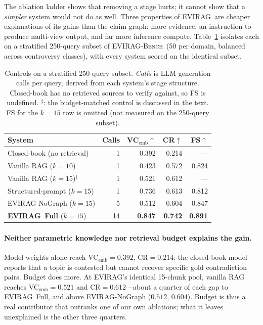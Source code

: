 \documentclass[11pt]{article}
\newcommand{\system}{\textsc{EVIRAG}\xspace}
\newcommand{\bench}{\textsc{EVIRAG-Bench}\xspace}
\begin{document}
The ablation ladder shows that removing a stage hurts; it cannot show that a
\emph{simpler} system would not do as well.  Three properties of \system\ are
cheaper explanations of its gains than the claim graph: more evidence, an
instruction to produce multi-view output, and far more inference compute.
Table~\ref{tab:controls} isolates each on a stratified 250-query subset of
\bench\ (50 per domain, balanced across controversy classes), with every system
scored on the identical subset.

\begin{table}[t]
\centering\small
\setlength{\tabcolsep}{3.5pt}
\begin{tabular}{@{}lrrrr@{}}
\toprule
\textbf{System} & \textbf{Calls} & VC$_{\text{emb}}$$\uparrow$ & CR$\uparrow$ & FS$\uparrow$ \\
\midrule
Closed-book (no retrieval)   & 1 & 0.392 & 0.214 & --- \\
Vanilla RAG ($k{=}10$)       & 1 & 0.423 & 0.572 & 0.824 \\
Vanilla RAG ($k{=}15$)$^\ddagger$ & 1 & 0.521 & 0.612 & --- \\
Structured-prompt ($k{=}15$) & 1 & 0.736 & 0.613 & 0.812 \\
\midrule
\system-NoGraph ($k{=}15$)   & \phantom{0}5 & 0.512 & 0.604 & 0.847 \\
\textbf{\system\ Full} ($k{=}15$) & 14 & \textbf{0.847} & \textbf{0.742} & \textbf{0.891} \\
\bottomrule
\end{tabular}
\caption{Controls on a stratified 250-query subset.  \emph{Calls} is
LLM generation calls per query, derived from each system's stage structure.
Closed-book has no retrieved sources to verify against, so FS is undefined.
$^\ddagger$: the budget-matched control is discussed in the text.
FS for the $k{=}15$ row is omitted (not measured on the 250-query subset).
}
\label{tab:controls}
\end{table}

\paragraph{Neither parametric knowledge nor retrieval budget explains the gain.}
Model weights alone reach VC$_\text{emb}{=}0.392$, CR$=0.214$: the closed-book
model reports that a topic is contested but cannot recover specific gold
contradiction pairs.  Budget does more.  At \system's identical 15-chunk pool,
vanilla RAG reaches VC$_\text{emb}{=}0.521$ and CR$=0.612$---about a quarter of
each gap to \system\ Full, and above \system-NoGraph ($0.512$, $0.604$).
Budget is thus a real contributor that outranks one of our own ablations; what
it leaves unexplained is the other three quarters.
\end{document}
